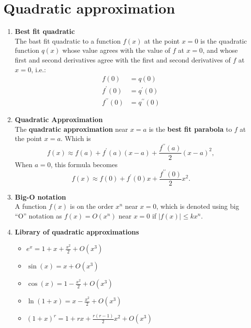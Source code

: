 \section{Quadratic approximation}
\begin{enumerate}
    \item \textbf{Best fit quadratic}\\
        \indent The bast fit quadratic to a function \(f(x)\) at the point \(x=0\) is the quadratic function \(q(x)\) whose value agrees with the value of \(f\) at \(x=0\), and whose first and second derivatives agree with the first and second derivatives of \(f\) at \(x=0\), i.e.:
        \begin{align*}
            f(0) & =q(0) \\
            f^\prime (0) & =q^\prime (0) \\
            f^{\prime\prime}(0) & =q^{\prime\prime}(0)
        \end{align*}
    \item \textbf{Quadratic Approximation}\\
        \indent The \textbf{quadratic approximation} near \(x=a\) is the \textbf{best fit parabola} to \(f\) at the point \(x=a\). Which is 
        \[
            f(x)\approx f(a)+f^\prime (a)(x-a)+\frac{f^{\prime\prime}(a)}{2}(x-a)^2,
        \]
        When \(a=0\), this formula becomes
        \[
            f(x)\approx f(0)+f^\prime (0)x+\frac{f^{\prime\prime}(0)}{2}x^2.
        \]
    \item \textbf{Big-O notation}\\
        \indent A function \(f(x)\) is on the order \(x^n\) near \(x=0\), which is denoted using big ``O'' notation as \(f(x)=O(x^n)\) near \(x=0\) if \(|f(x)|\leq kx^n\).
    \item \textbf{Library of quadratic approximations}
        \begin{itemize}
            \item \(e^x=1+x+\frac{x^2}{2}+O(x^3)\)
            \item \(\sin(x)=x+O(x^3)\)
            \item \(\cos(x)=1-\frac{x^2}{2}+O(x^3)\)
            \item \(\ln(1+x)=x-\frac{x^2}{2}+O(x^3)\)
            \item \((1+x)^r=1+rx+\frac{r(r-1)}{2}x^2+O(x^3)\)
        \end{itemize}
\end{enumerate}

